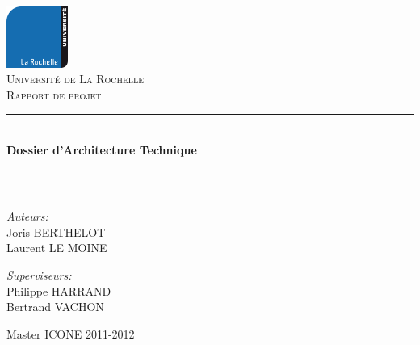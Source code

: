 \newcommand{\HRule}{\rule{\linewidth}{0.5mm}}

\begin{titlepage}

\begin{center}


\includegraphics[width=0.15\textwidth]{content/logo.png}\\[1cm]

\textsc{\LARGE Universit\'e de La Rochelle}\\[1.5cm]

\textsc{\Large Rapport de projet}\\[0.5cm]


\HRule \\[0.4cm]
{ \huge \bfseries Dossier d'Architecture Technique}\\[0.4cm]

\HRule \\[1.5cm]

\begin{minipage}{0.4\textwidth}
    \begin{flushleft} \large
        \emph{Auteurs:}\\
        Joris \textsc{BERTHELOT}\\
        Laurent \textsc{LE MOINE}
    \end{flushleft}
\end{minipage}
\begin{minipage}{0.4\textwidth}
    \begin{flushright} \large
        \emph{Superviseurs:} \\
        Philippe \textsc{HARRAND}\\
        Bertrand \textsc{VACHON}
    \end{flushright}
\end{minipage}

\vfill

{Master ICONE 2011-2012}

\end{center}

\end{titlepage}